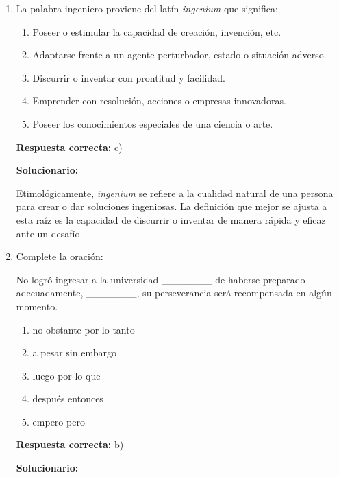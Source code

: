 \begin{enumerate}[resume]
	
	\item La palabra ingeniero proviene del latín \textit{ingenium} que significa:
	
	\begin{enumerate}[label=\alph*)]
		\item Poseer o estimular la capacidad de creación, invención, etc.
		\item Adaptarse frente a un agente perturbador, estado o situación adverso.
		\item Discurrir o inventar con prontitud y facilidad.
		\item Emprender con resolución, acciones o empresas innovadoras.
		\item Poseer los conocimientos especiales de una ciencia o arte.
	\end{enumerate}
	
	\textbf{Respuesta correcta:} c)
	
	\vspace{2mm}
	\textbf{Solucionario:}
	
	Etimológicamente, \textit{ingenium} se refiere a la cualidad natural de una persona para crear o dar soluciones ingeniosas. La definición que mejor se ajusta a esta raíz es la capacidad de discurrir o inventar de manera rápida y eficaz ante un desafío.
	
	\vspace{6mm}
	
	\item Complete la oración:
	
	No logró ingresar a la universidad \_\_\_\_\_\_\_ de haberse preparado adecuadamente, \_\_\_\_\_\_\_, su perseverancia será recompensada en algún momento.
	
	\begin{enumerate}[label=\alph*)]
		\item no obstante \textemdash por lo tanto
		\item a pesar \textemdash sin embargo
		\item luego \textemdash por lo que
		\item después \textemdash entonces
		\item empero \textemdash pero
	\end{enumerate}
	
	\textbf{Respuesta correcta:} b)
	
	\vspace{2mm}
	\textbf{Solucionario:}
	

\end{enumerate}
